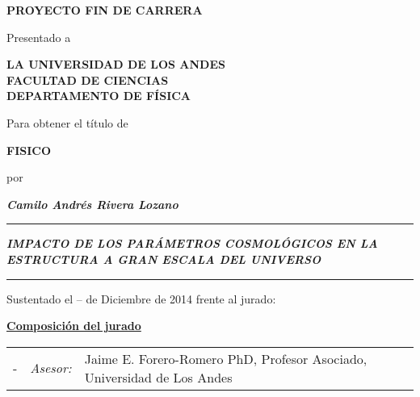 \thispagestyle{empty}


\begin{center}

\vspace{2.5cm}

\begin{large}
\textbf{PROYECTO FIN DE CARRERA}\\

\vspace{0.7cm}

Presentado a\\

\vspace{0.7cm}

\textbf{LA UNIVERSIDAD DE LOS ANDES\\
FACULTAD DE CIENCIAS\\
DEPARTAMENTO DE FÍSICA}\\

\vspace{1.5cm}

Para obtener el título de\\

\vspace{0.7cm}

\textbf{FISICO}\\

\vspace{1cm}

por\\ 

\vspace{0.7cm}

\textit{\textbf{Camilo Andrés Rivera Lozano}}\\

\vspace{1cm}

\rule[10pt]{\textwidth}{1pt}
\textbf{\textit{IMPACTO DE LOS PARÁMETROS COSMOLÓGICOS EN LA ESTRUCTURA A GRAN ESCALA DEL UNIVERSO}}\\
\vspace{0.7cm}
\rule[10pt]{\textwidth}{1pt}

\vspace{1cm}

Sustentado el -- de Diciembre de 2014 frente al jurado:

\vspace{1cm}

\textbf{\underline{Composición del jurado}}

\vspace{1cm}

\end{large}

\begin{tabular}{p{}p{}p{}}
-	&	\textit{Asesor:}	&  Jaime E. Forero-Romero PhD, Profesor Asociado, Universidad de Los Andes\\
\end{tabular}

\end{center}

